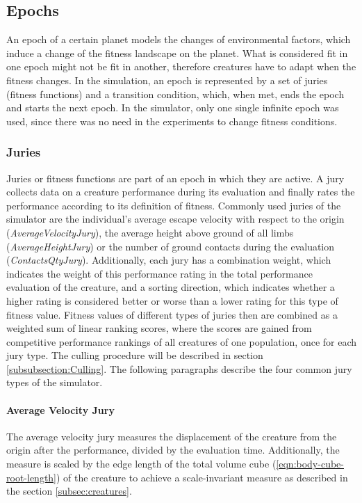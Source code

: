 \documentclass[main]{subfiles}
\begin{document}
\subsection{Epochs}

An epoch of a certain planet models the changes of environmental factors, which induce a change of the fitness landscape on the planet. %
%
What is considered fit in one epoch might not be fit in another, therefore creatures have to adapt when the fitness changes. %
%
In the simulation, an epoch is represented by a set of juries (fitness functions) and a transition condition, which, when met, ends the epoch and starts the next epoch. %
%
In the simulator, only one single infinite epoch was used, since there was no need in the experiments to change fitness conditions.

\subsubsection{Juries}

Juries or fitness functions are part of an epoch in which they are active. %
%
A jury collects data on a creature performance during its evaluation and finally rates the performance according to its definition of fitness. %
%
Commonly used juries of the simulator are the individual's average escape velocity with respect to the origin \mbox{(\textit{AverageVelocityJury})}, the average height above ground of all limbs \mbox{(\textit{AverageHeightJury})} or the number of ground contacts during the evaluation \mbox{(\textit{ContactsQtyJury})}. %
%
Additionally, each jury has a combination weight, which indicates the weight of this performance rating in the total performance evaluation of the creature, and a sorting direction, which indicates whether a higher rating is considered better or worse than a lower rating for this type of fitness value. %
%
Fitness values of different types of juries then are combined as a weighted sum of  linear ranking scores, where the scores are gained from competitive performance rankings of all creatures of one population, once for each jury type. %
%
The culling procedure will be described in section \ref{subsubsection:Culling}. %
%
The following paragraphs describe the four common jury types of the simulator.

\paragraph{Average Velocity Jury} The average velocity jury measures the displacement of the creature from the origin after the performance, divided by the evaluation time. %
%
Additionally, the measure is scaled by the edge length of the total volume cube (\eqref{eqn:body-cube-root-length}) of the creature to achieve a scale-invariant measure as described in the section \ref{subsec:creatures}.
\end{document}
